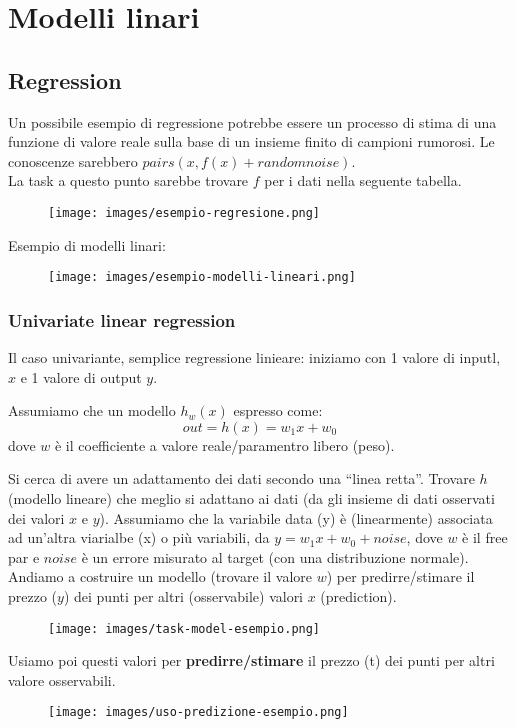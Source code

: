 \newpage
\section{Modelli linari}
\subsection{Regression}
Un possibile esempio di regressione potrebbe essere un processo di stima di una funzione di valore
reale sulla base di un insieme finito di campioni rumorosi. Le conoscenze sarebbero $pairs(x, f(x) + random noise)$.\\
La task a questo punto sarebbe trovare $f$ per i dati nella seguente tabella.
\begin{figure}[h!]
    \centering
    \texttt{[image: images/esempio-regresione.png]}
\end{figure}
\begin{example}
    Esempio di modelli linari:
    \begin{figure}[h!]
        \centering
        \texttt{[image: images/esempio-modelli-lineari.png]}
    \end{figure}
\end{example}

\subsubsection{Univariate linear regression}
Il caso univariante, semplice regressione linieare: iniziamo con 1 valore di inputl, $x$ e 
1 valore di output $y$.
\begin{definition}
    Assumiamo che un modello $h_w(x)$ espresso come:
    $$out = h(x) = w_1x + w_0$$
    dove $w$ è il coefficiente a valore reale/paramentro libero (peso).
\end{definition}
Si cerca di avere un adattamento dei dati secondo una “linea retta”. Trovare $h$ (modello lineare) che 
meglio si adattano ai dati (da gli insieme di dati osservati dei valori $x$ e $y$). Assumiamo che la variabile data (y) è (linearmente) 
associata ad un'altra viarialbe (x) o più variabili, da $y = w_1x + w_0 + noise$, dove $w$ è il free par e $noise$ è
un errore misurato al target (con una distribuzione normale). Andiamo a costruire un modello (trovare il valore $w$) per predirre/stimare il prezzo ($y$) dei punti
per altri (osservabile) valori $x$ (prediction).
\begin{figure}[h!]
    \centering
    \texttt{[image: images/task-model-esempio.png]}
\end{figure}
Usiamo poi questi valori per \textbf{predirre/stimare} il prezzo (t) dei punti per altri valore osservabili.
\begin{figure}[h!]
    \centering
    \texttt{[image: images/uso-predizione-esempio.png]}
\end{figure}

